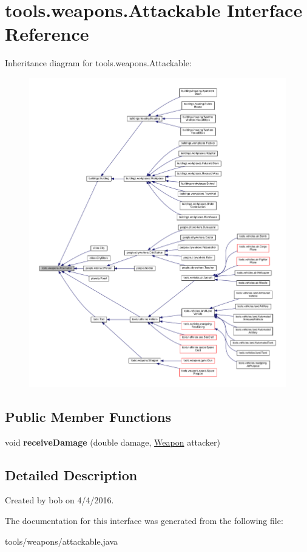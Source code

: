 \hypertarget{interfacetools_1_1weapons_1_1_attackable}{}\section{tools.\+weapons.\+Attackable Interface Reference}
\label{interfacetools_1_1weapons_1_1_attackable}


Inheritance diagram for tools.\+weapons.\+Attackable\+:
\nopagebreak
\begin{figure}[H]
\begin{center}
\leavevmode
\includegraphics[width=350pt]{interfacetools_1_1weapons_1_1_attackable__inherit__graph}
\end{center}
\end{figure}
\subsection*{Public Member Functions}
\begin{DoxyCompactItemize}
\item 
void {\bfseries receive\+Damage} (double damage, \hyperlink{classtools_1_1weapons_1_1_weapon}{Weapon} attacker)\hypertarget{interfacetools_1_1weapons_1_1_attackable_a1727869e1910076f6bc00b771c7167ed}{}\label{interfacetools_1_1weapons_1_1_attackable_a1727869e1910076f6bc00b771c7167ed}

\end{DoxyCompactItemize}


\subsection{Detailed Description}
Created by bob on 4/4/2016. 

The documentation for this interface was generated from the following file\+:\begin{DoxyCompactItemize}
\item 
tools/weapons/attackable.\+java\end{DoxyCompactItemize}
